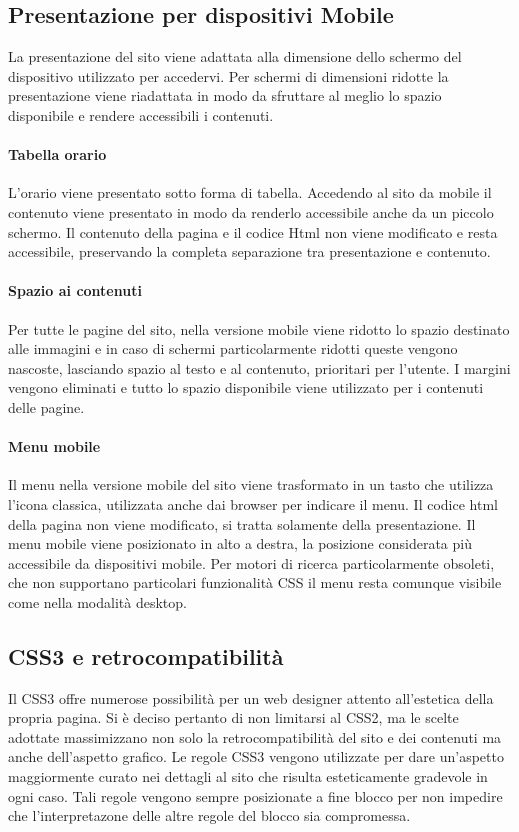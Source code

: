 \documentclass[12pt,a4paper]{article}
\begin{document}
\subsection{Presentazione per dispositivi Mobile}
La presentazione del sito viene adattata alla dimensione dello schermo del dispositivo utilizzato per accedervi. 
Per schermi di dimensioni ridotte la presentazione viene riadattata in modo da sfruttare al meglio lo spazio disponibile e rendere accessibili i contenuti. 
\paragraph{Tabella orario}
L'orario viene presentato sotto forma di tabella. Accedendo al sito da mobile il contenuto viene presentato in modo da renderlo accessibile anche da un piccolo schermo. 
Il contenuto della pagina e il codice Html non viene modificato e resta accessibile, preservando la completa separazione tra presentazione e contenuto. 

\paragraph{Spazio ai contenuti} Per tutte le pagine del sito, nella versione mobile viene ridotto lo spazio destinato alle immagini e in caso di schermi particolarmente ridotti queste vengono nascoste, lasciando spazio al testo e al contenuto, prioritari per l'utente. 
I margini vengono eliminati e tutto lo spazio disponibile viene utilizzato per i contenuti delle pagine.

\paragraph{Menu mobile} Il menu nella versione mobile del sito viene trasformato in un tasto che utilizza l'icona classica, utilizzata anche dai browser per indicare il menu. 
Il codice html della pagina non viene modificato, si tratta solamente della presentazione. 
Il menu mobile viene posizionato in alto a destra, la posizione considerata più accessibile da dispositivi mobile. 
Per motori di ricerca particolarmente obsoleti, che non supportano particolari funzionalità CSS il menu resta comunque visibile come nella modalità desktop.
\subsection{CSS3 e retrocompatibilità}
Il CSS3 offre numerose possibilità per un web designer attento all'estetica della propria pagina. 
Si è deciso pertanto di non limitarsi al CSS2, ma le scelte adottate massimizzano non solo la retrocompatibilità del sito e dei contenuti ma anche dell'aspetto grafico. 
Le regole CSS3 vengono utilizzate per dare un'aspetto maggiormente curato nei dettagli al sito che risulta esteticamente gradevole in ogni caso. 
Tali regole vengono sempre posizionate a fine blocco per non impedire che l'interpretazone delle altre regole del blocco sia compromessa. 
\end{document}
